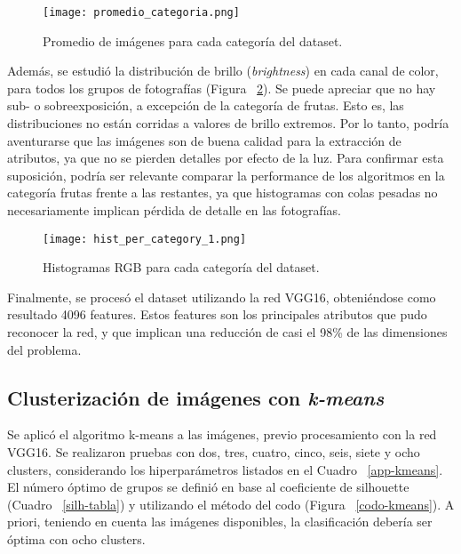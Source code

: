 \documentclass[journal,article,submit,pdftex,moreauthors]{Definitions/mdpi}
\begin{document}
\begin{figure}[H]
\texttt{[image: promedio\_categoria.png]}
\captionsetup{justification=centering}
\caption{Promedio de imágenes para cada categoría del dataset.\label{promedio-cat}}
\end{figure}   
\skip

Además, se estudió la distribución de brillo (\textit{brightness}) en cada canal de color, para todos los grupos de fotografías (Figura ~\ref{hist-cat}). Se puede apreciar que no hay sub- o sobreexposición, a excepción de la categoría de frutas. Esto es, las distribuciones no están corridas a valores de brillo extremos. Por lo tanto, podría aventurarse que las imágenes son de buena calidad para la extracción de atributos, ya que no se pierden detalles por efecto de la luz. Para confirmar esta suposición, podría ser relevante comparar la performance de los algoritmos en la categoría frutas frente a las restantes, ya que histogramas con colas pesadas no necesariamente implican pérdida de detalle en las fotografías.

\begin{figure}[H]
\texttt{[image: hist\_per\_category\_1.png]}
\captionsetup{justification=centering}
\caption{Histogramas RGB para cada categoría del dataset.\label{hist-cat}}
\captionsetup{justification=centering}
\end{figure}   
\skip

Finalmente, se procesó el dataset utilizando la red VGG16, obteniéndose como resultado 4096 features. Estos features son los principales atributos que pudo reconocer la red, y que implican una reducción de casi el 98\% de las dimensiones del problema.

\subsection{Clusterización de imágenes con \textit{k-means}}\label{kmeans}

Se aplicó el algoritmo k-means a las imágenes, previo procesamiento con la red VGG16. Se realizaron pruebas con dos, tres, cuatro, cinco, seis, siete y ocho clusters, considerando los hiperparámetros listados en el Cuadro ~\ref{app-kmeans}. El número óptimo de grupos se definió en base al coeficiente de silhouette (Cuadro ~\ref{silh-tabla}) y utilizando el método del codo (Figura ~\ref{codo-kmeans}). A priori, teniendo en cuenta las imágenes disponibles, la clasificación debería ser óptima con ocho clusters.
\end{document}
